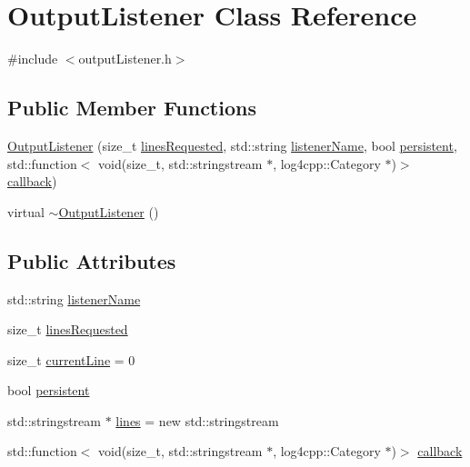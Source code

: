 \hypertarget{class_output_listener}{}\section{Output\+Listener Class Reference}
\label{class_output_listener}


{\ttfamily \#include $<$output\+Listener.\+h$>$}

\subsection*{Public Member Functions}
\begin{DoxyCompactItemize}
\item 
\hyperlink{class_output_listener_afaee1906fcbf0c1d9505422c4d4884d2}{Output\+Listener} (size\+\_\+t \hyperlink{class_output_listener_abb8ce2026a4a754052ab9eef9948bc1e}{lines\+Requested}, std\+::string \hyperlink{class_output_listener_af6b1a417d85bbd263c9de3aa9f522874}{listener\+Name}, bool \hyperlink{class_output_listener_a51c65d7914c84d10a26cbf49534b449a}{persistent}, std\+::function$<$ void(size\+\_\+t, std\+::stringstream $\ast$, log4cpp\+::\+Category $\ast$)$>$ \hyperlink{class_output_listener_a1749d1674b76f5bd22100ee16cfc1d9c}{callback})
\item 
virtual \hyperlink{class_output_listener_a17a01b02f6874e4181871df2d1f61f35}{$\sim$\+Output\+Listener} ()
\end{DoxyCompactItemize}
\subsection*{Public Attributes}
\begin{DoxyCompactItemize}
\item 
std\+::string \hyperlink{class_output_listener_af6b1a417d85bbd263c9de3aa9f522874}{listener\+Name}
\item 
size\+\_\+t \hyperlink{class_output_listener_abb8ce2026a4a754052ab9eef9948bc1e}{lines\+Requested}
\item 
size\+\_\+t \hyperlink{class_output_listener_a83775110ce744596cb13189417d5485d}{current\+Line} = 0
\item 
bool \hyperlink{class_output_listener_a51c65d7914c84d10a26cbf49534b449a}{persistent}
\item 
std\+::stringstream $\ast$ \hyperlink{class_output_listener_adaba1b44274920c6763bf479db77b7db}{lines} = new std\+::stringstream
\item 
std\+::function$<$ void(size\+\_\+t, std\+::stringstream $\ast$, log4cpp\+::\+Category $\ast$)$>$ \hyperlink{class_output_listener_a1749d1674b76f5bd22100ee16cfc1d9c}{callback}
\end{DoxyCompactItemize}



